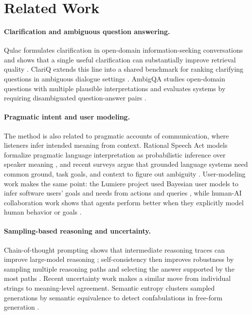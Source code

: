 \section{Related Work}

\paragraph{Clarification and ambiguous question answering.}
Qulac formulates clarification in open-domain information-seeking conversations and shows that a single useful clarification can substantially improve retrieval quality \citep{aliannejadi2019qulac}. ClariQ extends this line into a shared benchmark for ranking clarifying questions in ambiguous dialogue settings \citep{aliannejadi2020clariq}. AmbigQA studies open-domain questions with multiple plausible interpretations and evaluates systems by requiring disambiguated question-answer pairs \citep{min2020ambigqa}.

\paragraph{Pragmatic intent and user modeling.}
The method is also related to pragmatic accounts of communication, where listeners infer intended meaning from context. Rational Speech Act models formalize pragmatic language interpretation as probabilistic inference over speaker meaning \citep{goodman2016rsa}, and recent surveys argue that grounded language systems need common ground, task goals, and context to figure out ambiguity \citep{fried2022pragmatics}. User-modeling work makes the same point: the Lumiere project used Bayesian user models to infer software users' goals and needs from actions and queries \citep{horvitz1998lumiere}, while human-AI collaboration work shows that agents perform better when they explicitly model human behavior or goals \citep{carroll2019utility,liu2016goal,zhi2024clips}.

\paragraph{Sampling-based reasoning and uncertainty.}
Chain-of-thought prompting shows that intermediate reasoning traces can improve large-model reasoning \citep{wei2022chain}; self-consistency then improves robustness by sampling multiple reasoning paths and selecting the answer supported by the most paths \citep{wang2023selfconsistency}. Recent uncertainty work makes a similar move from individual strings to meaning-level agreement. Semantic entropy clusters sampled generations by semantic equivalence to detect confabulations in free-form generation \citep{farquhar2024semanticentropy}.


